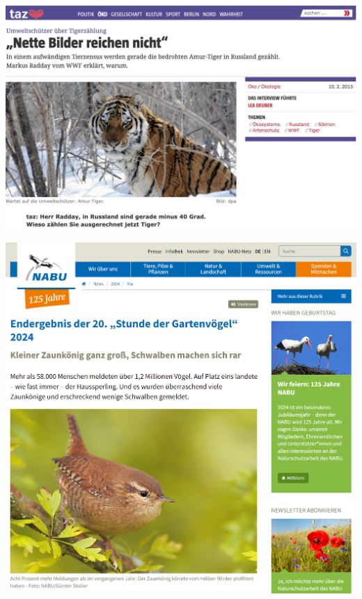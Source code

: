 \documentclass[aspectratio=169]{../latex_main/tntbeamer}  %
\begin{document}
	\begin{frame}
            \centering
	    \includegraphics[scale=.4]{figure/census_tiger.png}
	\end{frame}

 	\begin{frame}
            \centering
	    \includegraphics[scale=0.35]{figure/census_nabu.png}
	\end{frame}
 
\end{document}
